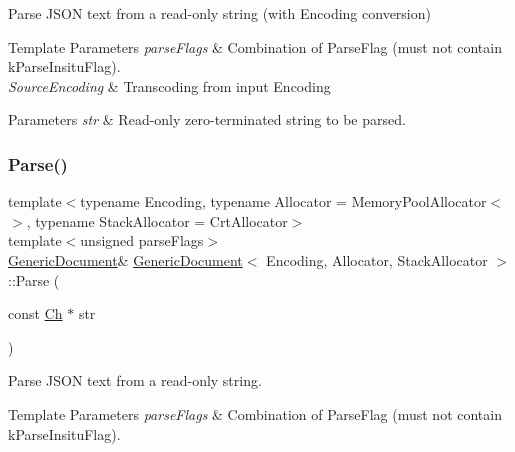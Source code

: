Parse J\+S\+ON text from a read-\/only string (with Encoding conversion) 


\begin{DoxyTemplParams}{Template Parameters}
{\em parse\+Flags} & Combination of Parse\+Flag (must not contain k\+Parse\+Insitu\+Flag). \\
\hline
{\em Source\+Encoding} & Transcoding from input Encoding \\
\hline
\end{DoxyTemplParams}

\begin{DoxyParams}{Parameters}
{\em str} & Read-\/only zero-\/terminated string to be parsed. \\
\hline
\end{DoxyParams}
\mbox{\label{classGenericDocument_a5e377f840009b5cee6757be29525ce0b}} 
\subsubsection{\texorpdfstring{Parse()}{Parse()}\hspace{0.1cm}{\footnotesize\ttfamily [5/6]}}
{\footnotesize\ttfamily template$<$typename Encoding, typename Allocator = Memory\+Pool\+Allocator$<$$>$, typename Stack\+Allocator = Crt\+Allocator$>$ \\
template$<$unsigned parse\+Flags$>$ \\
\hyperlink{classGenericDocument}{Generic\+Document}\& \hyperlink{classGenericDocument}{Generic\+Document}$<$ Encoding, Allocator, Stack\+Allocator $>$\+::Parse (\begin{DoxyParamCaption}\item[{const \hyperlink{classGenericValue_ade0e0ce64ccd5d852da57a35e720bafb}{Ch} $\ast$}]{str }\end{DoxyParamCaption})\hspace{0.3cm}{\ttfamily [inline]}}



Parse J\+S\+ON text from a read-\/only string. 


\begin{DoxyTemplParams}{Template Parameters}
{\em parse\+Flags} & Combination of Parse\+Flag (must not contain k\+Parse\+Insitu\+Flag). \\
\hline
\end{DoxyTemplParams}

